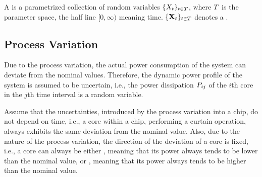 A  is a parametrized collection of random variables $\{ X_t \}_{t \in T}$, where $T$ is the parameter space, the half line $[0, \infty)$ meaning time. $\{ \mathbf{X}_t \}_{t \in T}$ denotes a .

\subsection{Process Variation} 
Due to the process variation, the actual power consumption of the system can deviate from the nominal values. Therefore, the dynamic power profile of the system is assumed to be uncertain, i.e., the power dissipation $P_{ij}$ of the $i$th core in the $j$th time interval is a random variable.

Assume that the uncertainties, introduced by the process variation into a chip, do not depend on time, i.e., a core within a chip, performing a curtain operation, always exhibits the same deviation from the nominal value. Also, due to the nature of the process variation, the direction of the deviation of a core is fixed, i.e., a core can always be either , meaning that its power always tends to be lower than the nominal value, or , meaning that its power always tends to be higher than the nominal value.
